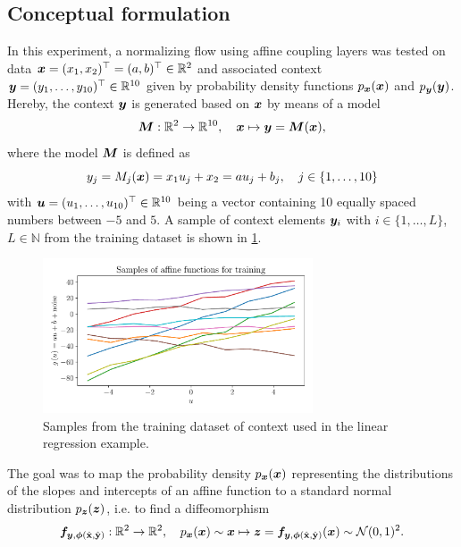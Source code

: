 \documentclass[a4paper,12pt]{report}
\begin{document}
\subsection{Conceptual formulation}
In this experiment, a normalizing flow using affine coupling layers was tested on data $\bm{x}=(x_1,x_2)^\top = (a,b)^\top \in \mathbb{R}^2$ and associated context $\bm{y}=(y_1,\dots,y_{10})^\top \in \mathbb{R}^{10}$ given by probability density functions $p_{\bm{x}}(\bm{x})$ and $p_{\bm{y}}(\bm{y})$. Hereby, the context $\bm{y}$ is generated based on $\bm{x}$ by means of a model
\begin{equation}\label{eq:linearmodellinregr}
\bm{M}:\mathbb{R}^2 \rightarrow \mathbb{R}^{10}, \quad \bm{x}\mapsto \bm{y} = \bm{M}(\bm{x}),
\end{equation} where the model $\bm{M}$ is defined as \begin{equation}
y_j = M_j(\bm{x}) = x_1 u_j + x_2 = a u_j + b_j, \quad j \in \{1,\dots,10\}
\end{equation} with $\bm{u} = (u_1,\dots,u_{10})^\top \in \mathbb{R}^{10}$ being a vector containing 10 equally spaced numbers between $-5$ and $5$. A sample of context elements $\bm{y}_i$ with $i \in \{1,\dots,L\}$, $L \in \mathbb{N}$ from the training dataset is shown in \cref{fig:sample-lines}.
\begin{figure}[h]
\centering
\includegraphics[width=8cm]{figures/nf-linear-regression-example-linesamples.pdf}
\caption{Samples from the training dataset of context used in the linear regression example.}
\label{fig:sample-lines}
\end{figure}

The goal was to map the probability density $p_{\bm{x}}(\bm{x})$ representing the distributions of the slopes and intercepts of an affine function to a standard normal distribution $p_{\bm{z}}(\bm{z})$, i.e. to find a diffeomorphism
\begin{equation}
\bm{f}_{\bm{y},\bm{\phi}(\hat{\boldsymbol{\mathbf{x}}},\hat{\boldsymbol{\mathbf{y}}})}: \mathbb{R}^2\rightarrow \mathbb{R}^2, \quad p_{\bm{x}}(\bm{x}) \sim \bm{x} \mapsto \bm{z} = \bm{f}_{\bm{y},\bm{\phi}(\hat{\boldsymbol{\mathbf{x}}},\hat{\boldsymbol{\mathbf{y}}})}(\bm{x}) \sim  \mathcal{N}(0,1)^2.
\end{equation}
\end{document}
